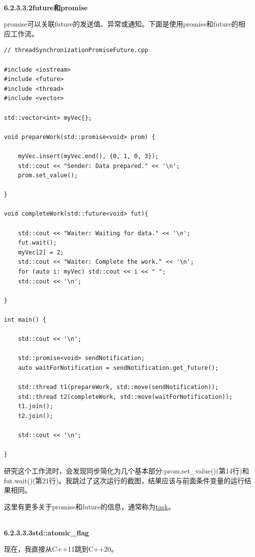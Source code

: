 \hspace*{\fill} \\ %
\noindent
\textbf{6.2.3.3.2\hspace{0.2cm}future和promise}

promise可以关联future的发送值、异常或通知。下面是使用promise和future的相应工作流。

\begin{lstlisting}[style=styleCXX]
// threadSynchronizationPromiseFuture.cpp

#include <iostream>
#include <future>
#include <thread>
#include <vector>

std::vector<int> myVec{};

void prepareWork(std::promise<void> prom) {
	
	myVec.insert(myVec.end(), {0, 1, 0, 3});
	std::cout << "Sender: Data prepared." << '\n';
	prom.set_value();

}

void completeWork(std::future<void> fut){

	std::cout << "Waiter: Waiting for data." << '\n';
	fut.wait();
	myVec[2] = 2;
	std::cout << "Waiter: Complete the work." << '\n';
	for (auto i: myVec) std::cout << i << " ";
	std::cout << '\n';

}

int main() {

	std::cout << '\n';
	
	std::promise<void> sendNotification;
	auto waitForNotification = sendNotification.get_future();
	
	std::thread t1(prepareWork, std::move(sendNotification));
	std::thread t2(completeWork, std::move(waitForNotification));
	t1.join();
	t2.join();
	
	std::cout << '\n';

}
\end{lstlisting}

研究这个工作流时，会发现同步简化为几个基本部分:prom.set\_value()(第14行)和fut.wait()(第21行)。我跳过了这次运行的截图，结果应该与前面条件变量的运行结果相同。

这里有更多关于promise和future的信息，通常称为\href{https://www.modernescpp.com/index.php/tag/tasks}{task}。

\hspace*{\fill} \\ %
\noindent
\textbf{6.2.3.3.3\hspace{0.2cm}std::atomic\_flag}

现在，我直接从C++11跳到C++20。

